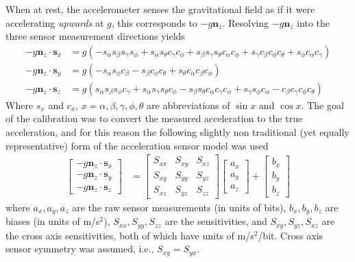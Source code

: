 When at rest, the accelerometer senses the gravitational field as if it were
accelerating \textit{upwards} at $g$, this corresponds to $-g\bm{n}_z$.
Resolving $-g\bm{n}_z$ into the three sensor measurement directions yields
\begin{align}
  \label{rb:eq:imux}
-g\bm{n}_z \cdot \bm{s}_x &= g \left(- s_{\alpha}
s_{\beta} s_{\gamma}
s_{\phi} + s_{\alpha}
s_{\theta} c_{\gamma}
c_{\phi} + s_{\beta}
s_{\gamma} s_{\theta}
c_{\alpha} c_{\phi} +
s_{\gamma} c_{\beta}
c_{\phi} c_{\theta} +
s_{\phi} c_{\alpha}
c_{\gamma}\right) \\
%
  \label{rb:eq:imuy}
-g\bm{n}_z \cdot \bm{s}_y &= g \left(- s_{\alpha}
s_{\phi} c_{\beta} -
s_{\beta} c_{\phi}
c_{\theta} + s_{\theta}
c_{\alpha} c_{\beta}
c_{\phi}\right) \\
%
  \label{rb:eq:imuz}
-g\bm{n}_z \cdot \bm{s}_z &= g \left(s_{\alpha}
s_{\beta} s_{\phi}
c_{\gamma} + s_{\alpha}
s_{\gamma} s_{\theta}
c_{\phi} - s_{\beta}
s_{\theta} c_{\alpha}
c_{\gamma} c_{\phi} +
s_{\gamma} s_{\phi}
c_{\alpha} - c_{\beta}
c_{\gamma} c_{\phi}
c_{\theta}\right)
\end{align}
Where $s_{x}$ and $c_{x}$, $x=\alpha,\beta,\gamma,\phi,\theta$ are
abbreviations of $\sin{x}$ and $\cos{x}$. The goal of the calibration was to
convert the measured acceleration to the true acceleration, and for this reason
the following slightly non traditional (yet equally representative) form of the
acceleration sensor model was used
\begin{align}
  \label{rb:eq:sensormodel}
  \left[
    \begin{matrix}
      -g\bm{n}_z \cdot \bm{s}_x \\
      -g\bm{n}_z \cdot \bm{s}_y \\
      -g\bm{n}_z \cdot \bm{s}_z
    \end{matrix}
  \right]
  &=
  \left[
    \begin{matrix}
      S_{xx} & S_{xy} & S_{xz}\\
      S_{xy} & S_{yy} & S_{yz}\\
      S_{xz} & S_{yz} & S_{zz}
    \end{matrix}
  \right]
  \left[
    \begin{matrix}
      a_{x} \\
      a_{y} \\
      a_{z}
    \end{matrix}
  \right]
  +
  \left[
    \begin{matrix}
      b_{x} \\
      b_{y} \\
      b_{z}
    \end{matrix}
  \right]
\end{align}
where $a_x, a_y, a_z$ are the raw sensor measurements (in units of bits), $b_x,
b_y, b_z$ are biases (in units of m/s$^2$), $S_{xx}, S_{yy}, S_{zz}$ are the
sensitivities, and $S_{xy}, S_{yz}, S_{xz}$ are the cross axis sensitivities,
both of which have units of m/s$^2$/bit. Cross axis sensor symmetry was
assumed, i.e., $S_{xy} = S_{yx}$.

